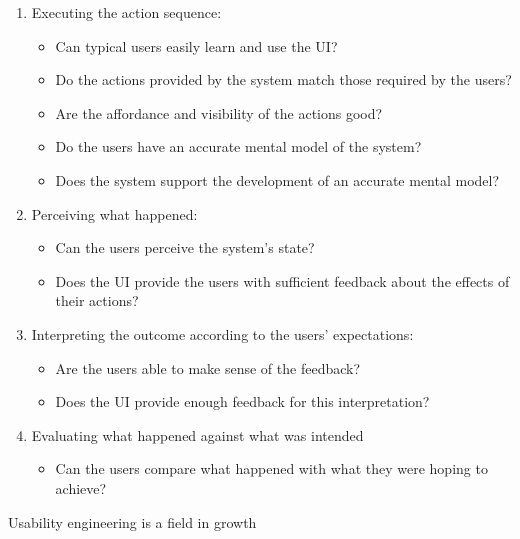 \begin{enumerate}
\begin{itemize}
  \end{itemize}  
  \item Executing the action sequence:
  \begin{itemize}
     \item Can typical users easily learn and use the UI?
     \item Do the actions provided by the system match those required by the users?
     \item Are the affordance and visibility of the actions good?
     \item Do the users have an accurate mental model of the system?
     \item Does the system support the development of an accurate mental model?
  \end{itemize}  
  \item Perceiving what happened:
  \begin{itemize}
     \item Can the users perceive the system’s state?
     \item Does the UI provide the users with sufficient feedback about the effects of their actions?
  \end{itemize}  
  \item Interpreting the outcome according to the users’ expectations:
  \begin{itemize}
     \item Are the users able to make sense of the feedback?
     \item Does the UI provide enough feedback for this interpretation?
  \end{itemize}  
  \item Evaluating what happened against what was intended
  \begin{itemize}
     \item Can the users compare what happened with what they were hoping to achieve?
  \end{itemize}  

\end{enumerate}


Usability engineering is a field in growth

